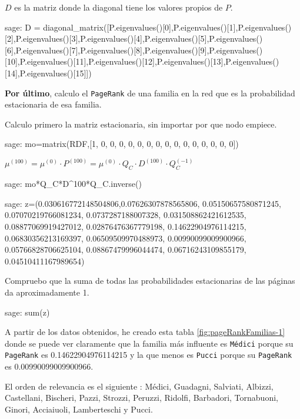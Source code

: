 \par $D$ es la matriz donde la diagonal tiene los valores propios de $P$.
\begin{sagecommandline}
    sage: D = diagonal_matrix([P.eigenvalues()[0],P.eigenvalues()[1],P.eigenvalues()[2],P.eigenvalues()[3],P.eigenvalues()[4],P.eigenvalues()[5],P.eigenvalues()[6],P.eigenvalues()[7],P.eigenvalues()[8],P.eigenvalues()[9],P.eigenvalues()[10],P.eigenvalues()[11],P.eigenvalues()[12],P.eigenvalues()[13],P.eigenvalues()[14],P.eigenvalues()[15]])
\end{sagecommandline}

\par \textbf{Por último}, calculo el \texttt{PageRank} de una familia en la red que es la probabilidad estacionaria de esa familia.
\par Calculo primero la matriz estacionaria, sin importar por que nodo empiece.
\begin{sagecommandline}
    sage: mo=matrix(RDF,[1, 0, 0, 0, 0, 0, 0, 0, 0, 0, 0, 0, 0, 0, 0, 0])
\end{sagecommandline}
\par $\mu^{(100)} = \mu^{(0)} \cdot P^{(100)} = \mu^{(0)} \cdot Q_C \cdot D^{(100)} \cdot Q_C^{(-1)}$
\begin{sagecommandline}
    sage: mo*Q_C*D^100*Q_C.inverse()
\end{sagecommandline}
\begin{sagecommandline}
    sage: z=(0.030616772148504806,0.07626307878565806, 0.05150657580871245, 0.07070219766081234, 0.0737287188007328, 0.031508862421612535, 0.08877069919427012, 0.02876476367779198, 0.14622904976114215, 0.06830356213169397, 0.06509509970488973, 0.00990099009900966, 0.05766828706625104, 0.08867479996044474, 0.06716243109855179, 0.04510411167989654)
\end{sagecommandline}

\par Compruebo que la suma de todas las probabilidades estacionarias de las páginas da aproximadamente 1.
\begin{sagecommandline}
    sage: sum(z)
\end{sagecommandline}

\par A partir de los datos obtenidos, he creado esta tabla \ref{fig:pageRankFamilias-1} donde se puede ver claramente que 
la familia más influente es \texttt{Médici} porque su \texttt{PageRank} es 0.14622904976114215 y la que menos es 
\texttt{Pucci} porque su \texttt{PageRank} es 0.00990099009900966.
\par El orden de relevancia es el siguiente : Médici, Guadagni, Salviati, Albizzi, Castellani, Bischeri, Pazzi, Strozzi, Peruzzi,
Ridolfi, Barbadori, Tornabuoni, Ginori, Acciaiuoli, Lamberteschi y Pucci.

